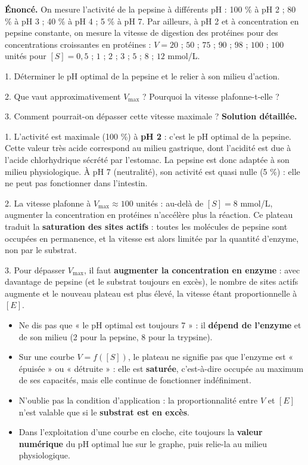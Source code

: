 \documentclass[11pt]{article}
\begin{document}
\begin{exoresolu}
\textbf{Énoncé.} On mesure l'activité de la pepsine à différents pH : 100 \% à pH 2 ; 80 \% à pH 3 ; 40 \% à pH 4 ; 5 \% à pH 7. Par ailleurs, à pH 2 et à concentration en pepsine constante, on mesure la vitesse de digestion des protéines pour des concentrations croissantes en protéines : $V = 20$ ; $50$ ; $75$ ; $90$ ; $98$ ; $100$ ; $100$ unités pour $[S] = 0,5$ ; $1$ ; $2$ ; $3$ ; $5$ ; $8$ ; $12$ mmol/L.\par
1. Déterminer le pH optimal de la pepsine et le relier à son milieu d'action.\par
2. Que vaut approximativement $V_{\max}$ ? Pourquoi la vitesse plafonne-t-elle ?\par
3. Comment pourrait-on dépasser cette vitesse maximale ?
\tcblower
\textbf{Solution détaillée.}\par
1. L'activité est maximale (100 \%) à \textbf{pH 2} : c'est le pH optimal de la pepsine. Cette valeur très acide correspond au milieu gastrique, dont l'acidité est due à l'acide chlorhydrique sécrété par l'estomac. La pepsine est donc adaptée à son milieu physiologique. À pH 7 (neutralité), son activité est quasi nulle (5 \%) : elle ne peut pas fonctionner dans l'intestin.\par
2. La vitesse plafonne à $V_{\max} \approx 100$ unités : au-delà de $[S] = 8$ mmol/L, augmenter la concentration en protéines n'accélère plus la réaction. Ce plateau traduit la \textbf{saturation des sites actifs} : toutes les molécules de pepsine sont occupées en permanence, et la vitesse est alors limitée par la quantité d'enzyme, non par le substrat.\par
3. Pour dépasser $V_{\max}$, il faut \textbf{augmenter la concentration en enzyme} : avec davantage de pepsine (et le substrat toujours en excès), le nombre de sites actifs augmente et le nouveau plateau est plus élevé, la vitesse étant proportionnelle à $[E]$.
\end{exoresolu}

\begin{attention}
\begin{itemize}
\item Ne dis pas que « le pH optimal est toujours 7 » : il \textbf{dépend de l'enzyme} et de son milieu (2 pour la pepsine, 8 pour la trypsine).
\item Sur une courbe $V = f([S])$, le plateau ne signifie pas que l'enzyme est « épuisée » ou « détruite » : elle est \textbf{saturée}, c'est-à-dire occupée au maximum de ses capacités, mais elle continue de fonctionner indéfiniment.
\item N'oublie pas la condition d'application : la proportionnalité entre $V$ et $[E]$ n'est valable que si le \textbf{substrat est en excès}.
\item Dans l'exploitation d'une courbe en cloche, cite toujours la \textbf{valeur numérique} du pH optimal lue sur le graphe, puis relie-la au milieu physiologique.
\end{itemize}
\end{attention}
\end{document}
